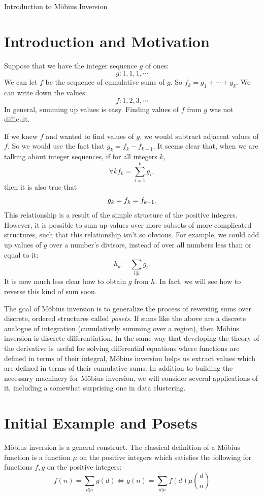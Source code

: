 \documentclass[12pt]{pom_thesis}
\begin{document}
\newpage
{}
\begin{chapter}{Introduction to M\"obius Inversion}\label{chap_intro}
\section{Introduction and Motivation}
Suppose that we have the integer sequence $g$ of ones:
\[
g : 1, 1, 1, \cdots
\]
We can let $f$ be the sequence of cumulative sums of $g$. So $f_k = g_1 + \cdots + g_k$. We can write down the values:
\[
f: 1,2,3,\cdots
\]
In general, summing up values is easy. Finding values of $f$ from $g$ was not difficult. 

If we knew $f$ and wanted to find values of $g$, we would subtract adjacent values of $f$. So we would use the fact that $g_k = f_k - f_{k-1}$. It seems clear that, when we are talking about integer sequences, if for all integers $k$,
\[
\forall k f_k = \sum_{i = 1}^k g_i,
\]
then it is also true that
\[\\
g_k = f_k = f_{k-1}.
\]
This relationship is a result of the simple structure of the positive integers. However, it is possible to sum up values over more subsets of more complicated structures, such that this relationship isn't so obvious. For example, we could add up values of $g$ over a number's divisors, instead of over all numbers less than or equal to it:
\[
h_k = \sum_{l|k}g_l.
\] 
It is now much less clear how to obtain $g$ from $h$. In fact, we will see how to reverse this kind of sum soon.

The goal of M\"obius inversion is to generalize the process of reversing sums over discrete, ordered structures called \emph{posets}. If sums like the above are a discrete analogue of integration (cumulatively summing over a region), then M\"obius inversion is discrete differentiation. In the same way that developing the theory of the derivative is useful for solving differential equations where functions are defined in terms of their integral, M\"obius inversion helps us extract values which are defined in terms of their cumulative sums. In addition to building the necessary machinery for M\"obius inversion, we will consider several applications of it, including a somewhat surprising one in data clustering.
\section{Initial Example and Posets}
M\"obius inversion is a general construct. The classical definition of a M\"obius function is a function $\mu$ on the positive integers which satisfies the following for functions $f,g$ on the positive integers:
\begin{equation}\label{init_mob} 
f(n) = \sum_{d | n} g(d) \iff g(n) = \sum_{d | n}  f(d)\mu\left(\frac dn\right)
\end{equation}


\end{chapter}
\end{document}
